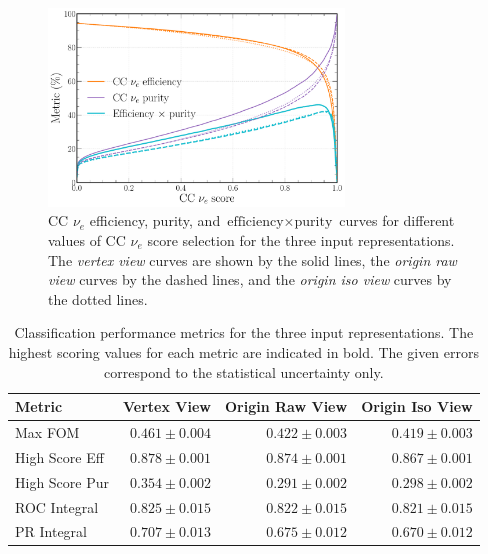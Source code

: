 \begin{figure} %
    \includegraphics[width=0.7\textwidth]{diagrams/7-results/repr_nuel_eff_curves.pdf}
    \caption[CC $\nu_{e}$ efficiency and purity curves for different input representations]
    {CC $\nu_{e}$ efficiency, purity, and $\text{efficiency}\times\text{purity}$ curves for
        different values of CC $\nu_{e}$ score selection for the three input representations. The
        \emph{vertex view} curves are shown by the solid lines, the \emph{origin raw view} curves
        by the dashed lines, and the \emph{origin iso view} curves by the dotted lines.}
    \label{fig:repr_nuel_eff_curves}
\end{figure}

\begin{table} %
    \begin{tabular}{lrrr}
        Metric         & Vertex View    & Origin Raw View & Origin Iso View \\
        \midrule
        Max FOM        & \textbf{$0.461\pm0.004$} & $0.422\pm0.003$ & $0.419\pm0.003$ \\
        High Score Eff & \textbf{$0.878\pm0.001$} & $0.874\pm0.001$ & $0.867\pm0.001$ \\
        High Score Pur & \textbf{$0.354\pm0.002$} & $0.291\pm0.002$ & $0.298\pm0.002$ \\
        ROC Integral   & \textbf{$0.825\pm0.015$} & $0.822\pm0.015$ & $0.821\pm0.015$ \\
        PR Integral    & \textbf{$0.707\pm0.013$} & $0.675\pm0.012$ & $0.670\pm0.012$ \\
    \end{tabular}
    \caption[Classification performance metrics for different input representations]
    {Classification performance metrics for the three input representations. The highest scoring
        values for each metric are indicated in bold. The given errors correspond to the
        statistical uncertainty only.}
    \label{tab:repr}
\end{table}

